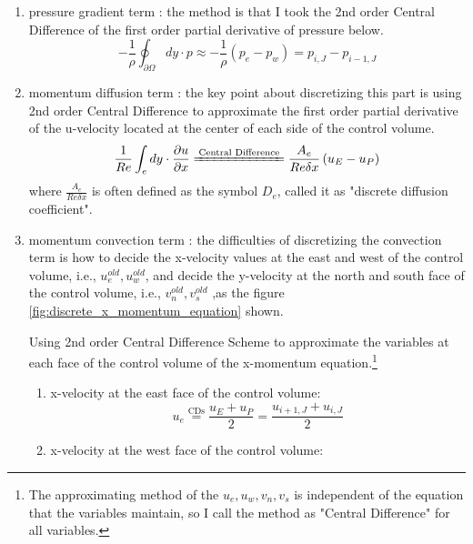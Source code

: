 \documentclass[12pt]{article}
\theoremstyle{plain}  %
\theoremstyle{definition}  %
\begin{document}
\begin{enumerate}
  \item pressure gradient term : the method is that I took the 2nd order Central Difference of the first order partial derivative of pressure below.
  \begin{equation}
  \label{eq:pressure_CDS}
  -\frac{1}{\rho}\oint_{\partial \Omega} dy \cdot p \approx 
  -\frac{1}{\rho} (p_{e} - p_{w}) = p_{i,J} - p_{i-1,J}  
\end{equation}
  \item momentum diffusion term : the key point about discretizing this part is using 2nd order Central Difference to approximate the first order partial derivative of the u-velocity located at the center of each side of the control volume.   
  \begin{equation}
    \frac{1}{Re} \int_{e} dy \cdot \frac{\partial u}{\partial x} 
    \xlongequal{\text{Central Difference}} \frac{A_{e}}{Re\delta x}\left(u_{E} - u_{P}\right)
  \end{equation}
  where $\frac{A_{e}}{Re \delta x}$ is often defined as the symbol $D_{e}$, called it as "discrete diffusion coefficient". 
  \item momentum convection term : 
  the difficulties of discretizing the convection term is how to decide the x-velocity values at the east and west of the control volume, i.e., $u_{e}^{old} , u_{w}^{old}$, and decide the y-velocity at the north and south face of the control volume, i.e., $v_{n}^{old} , v_{s}^{old}$  
  ,as the figure \ref{fig:discrete_x_momentum_equation} shown. 
  {\color{red}
  \begin{center}
    Using 2nd order Central Difference Scheme to approximate the variables at each face of the control volume of the x-momentum equation.\footnote{The approximating method of the $u_{e},u_{w},v_{n},v_{s}$ is independent of the equation that the variables maintain, so I call the method as "Central Difference" for all variables.} 
  \end{center}
  }
  \begin{enumerate}[label=(\arabic*)]
    \item x-velocity at the east face of the control volume:
    \begin{equation}
      u_{e} \overset{\text{CDs}}{=} \frac{u_{E} + u_{P}}{2} = \frac{u_{i+1,J} + u_{i,J}}{2}
    \end{equation}
    \item x-velocity at the west face of the control volume:
    \begin{equation}

\end{equation}
\end{enumerate}
\end{enumerate}
\end{document}
